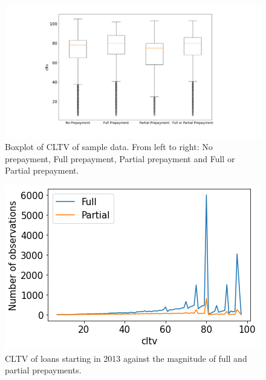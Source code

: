         \begin{figure}[H]
            \centering
            \includegraphics[width=\linewidth]{Figures/Boxplot_of_cltv_[2013, 2014, 2015, 2016, 2017, 2018, 2019, 2020]_.png}
            \caption{
                Boxplot of CLTV of sample data. From left to right: 
                No prepayment, Full prepayment, Partial prepayment 
                and Full or Partial prepayment.
                }
            \label{model_boxplot_CLTV}
        \end{figure}
        \begin{figure}
            \centering
            \includegraphics[width=0.6\linewidth]{Latex/Report/Figures/CLTV againts Full and Partial prepayments.png}
            \caption{CLTV of loans starting in 2013 against the magnitude of full and partial prepayments.}
            \label{model_CLTV_against_prepayment}
        \end{figure}

